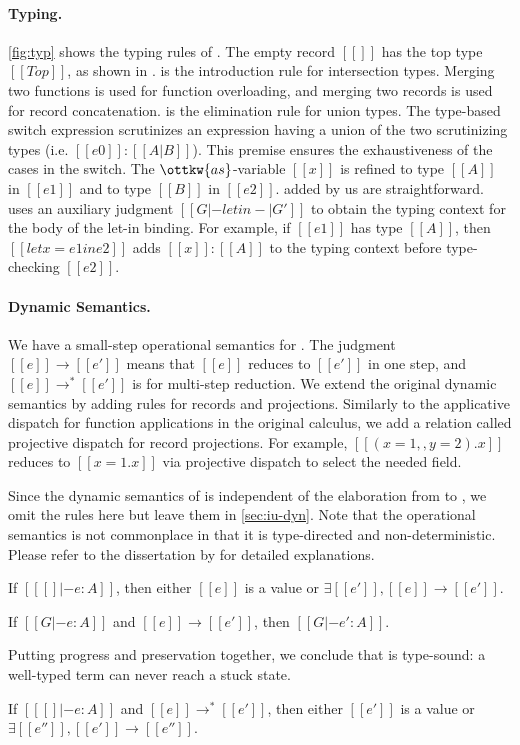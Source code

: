 \paragraph{Typing.}
\autoref{fig:typ} shows the typing rules of \lambdaiu. The empty record $[[{}]]$
has the top type $[[Top]]$, as shown in .  is the
introduction rule for intersection types. Merging two functions is used for
function overloading, and merging two records is used for record concatenation.
 is the elimination rule for union types. The type-based switch
expression scrutinizes an expression having a union of the two scrutinizing
types (i.e. $[[e0]]:[[A|B]]$). This premise ensures the exhaustiveness of the
cases in the switch. The $\ottkw{as}$-variable $[[x]]$ is refined to type
$[[A]]$ in $[[e1]]$ and to type $[[B]]$ in $[[e2]]$.
 added by us are straightforward. 
uses an auxiliary judgment $[[G |- letin -| G']]$ to obtain the typing context
for the body of the let-in binding. For example, if $[[e1]]$ has type $[[A]]$,
then $[[let x = e1 in e2]]$ adds $[[x]]:[[A]]$ to the typing context before
type-checking $[[e2]]$.

\paragraph{Dynamic Semantics.}
We have a small-step operational semantics for \lambdaiu. The judgment
$[[e]]\longrightarrow[[e']]$ means that $[[e]]$ reduces to $[[e']]$ in one step,
and $[[e]]\longrightarrow^*[[e']]$ is for multi-step reduction. We extend the
original dynamic semantics by adding rules for records and projections.
Similarly to the applicative dispatch for function applications in the original
calculus, we add a relation called projective dispatch for record projections.
For example, $[[({x = 1},,{y = 2}).x]]$ reduces to $[[{x = 1}.x]]$ via
projective dispatch to select the needed field.

Since the dynamic semantics of \lambdaiu is independent of the elaboration from
\uaena to \lambdaiu, we omit the rules here but leave them in
\autoref{sec:iu-dyn}. Note that the operational semantics is not commonplace in
that it is type-directed and non-deterministic. Please refer to the dissertation
by \citet{rehman2023blend} for detailed explanations.

\begin{theorem}[Progress]
  If $[[ [] |- e : A]]$, then either $[[e]]$ is a value or $\exists [[e']], [[e]] \longrightarrow [[e']]$.
\end{theorem}
\begin{theorem}[Preservation]
  If $[[G |- e : A]]$ and $[[e]] \longrightarrow [[e']]$, then $[[G |- e' : A]]$.
\end{theorem}
Putting progress and preservation together, we conclude that \lambdaiu is type-sound:
a well-typed term can never reach a stuck state.
\begin{corollary}
  If $[[ [] |- e : A]]$ and $[[e]] \longrightarrow^* [[e']]$, then either $[[e']]$ is a value or $\exists [[e'']], [[e']] \longrightarrow [[e'']]$.
\end{corollary}

